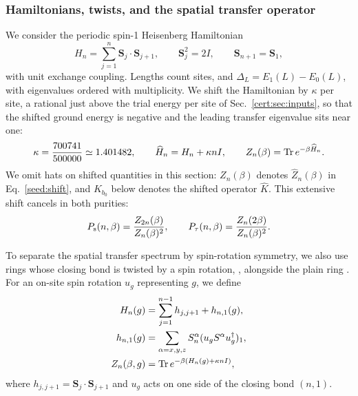 \subsubsection{Hamiltonians, twists, and the spatial transfer operator}
\label{cert:sec:transfer}

We consider the periodic spin-1 Heisenberg Hamiltonian
\begin{equation}
 H_n=\sum_{j=1}^n\bm S_j\cdot\bm S_{j+1},
 \qquad \bm S_j^2=2I,\qquad \bm S_{n+1}=\bm S_1,
 \label{cert:eq:hamiltonian}
\end{equation}
with unit exchange coupling. Lengths count sites, and
$\Delta_L=E_1(L)-E_0(L)$, with eigenvalues ordered with multiplicity.
We shift the Hamiltonian by $\kappa$ per site, a rational just above the
trial energy per site of Sec.~\ref{cert:sec:inputs}, so that the shifted
ground energy is negative and the leading transfer eigenvalue sits near
one:
\begin{equation}
 \kappa=\frac{700741}{500000}\simeq1.401482,\qquad
 \widehat H_n=H_n+\kappa nI,\qquad
 Z_n(\beta)=\operatorname{Tr} e^{-\beta\widehat H_n}.
 \label{cert:eq:shift}
\end{equation}
We omit hats on shifted quantities in this section: $Z_n(\beta)$
denotes $\widehat Z_n(\beta)$ in Eq.~\eqref{seed:shift}, and
$K_{b_0}$ below denotes the shifted operator $\widehat K$.
This extensive shift cancels in both purities:
\begin{equation}
 P_{\mathrm s}(n,\beta)=\frac{Z_{2n}(\beta)}{Z_n(\beta)^2},
 \qquad
 P_{\tau}(n,\beta)=\frac{Z_n(2\beta)}{Z_n(\beta)^2}.
 \label{cert:eq:purities}
\end{equation}

To separate the spatial transfer spectrum by spin-rotation symmetry, we
also use rings whose closing bond is twisted by a spin rotation,
, alongside the plain ring . For an on-site spin
rotation $u_g$ representing $g$, we define
\begin{align}
 H_n(g)&=\sum_{j=1}^{n-1}h_{j,j+1}+h_{n,1}(g),\notag \\
 h_{n,1}(g)&=\sum_{\alpha=x,y,z}
 S_n^\alpha(u_gS^\alpha u_g^\dagger)_1,\notag \\
 Z_n(\beta,g)&=\operatorname{Tr} e^{-\beta(H_n(g)+\kappa nI)},
 \label{cert:eq:twisted-hamiltonian}
\end{align}
where $h_{j,j+1}=\bm S_j\cdot\bm S_{j+1}$ and $u_g$ acts on one side of
the closing bond $(n,1)$.


